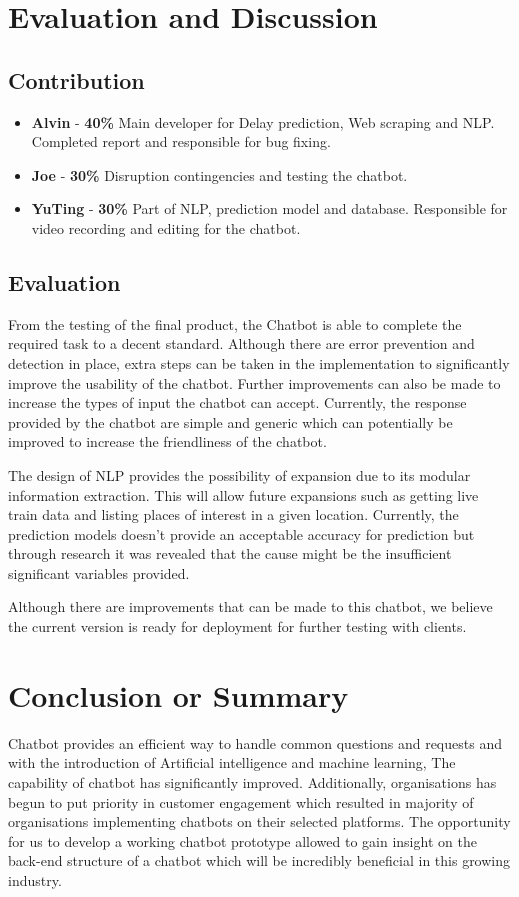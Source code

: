 \documentclass[11pt]{article}
\begin{document}
\section{Evaluation and Discussion}
\subsection{Contribution}
\begin{itemize}
	\item \textbf{Alvin}  - \textbf{40\%} Main developer for Delay prediction, Web scraping and NLP. Completed report and responsible for bug fixing.
	\item \textbf{Joe}    - \textbf{30\%} Disruption contingencies and testing the chatbot.
	\item \textbf{YuTing} - \textbf{30\%} Part of NLP, prediction model and database. Responsible for video recording and editing for the chatbot.
\end{itemize}

\subsection{Evaluation}
From the testing of the final product, the Chatbot is able to complete the required task to a decent standard. Although there are error prevention and detection in place, extra steps can be taken in the implementation to significantly improve the usability of the chatbot. Further improvements can also be made to increase the types of input the chatbot can accept. Currently, the response provided by the chatbot are simple and generic which can potentially be improved to increase the friendliness of the chatbot.

The design of NLP provides the possibility of expansion due to its modular information extraction. This will allow future expansions such as getting live train data and listing places of interest in a given location. Currently, the prediction models doesn't provide an acceptable accuracy for prediction but through research it was revealed that the cause might be the insufficient significant variables provided. 

Although there are improvements that can be made to this chatbot, we believe the current version is ready for deployment for further testing with clients.

\section{Conclusion or Summary}
Chatbot provides an efficient way to handle common questions and requests and with the introduction of Artificial intelligence and machine learning, The capability of chatbot has significantly improved. Additionally, organisations has begun to put priority in customer engagement which resulted in majority of organisations implementing chatbots on their selected platforms. The opportunity for us to develop a working chatbot prototype allowed to gain insight on the back-end structure of a chatbot which will be incredibly beneficial in this growing industry.


%
 
\end{document}
